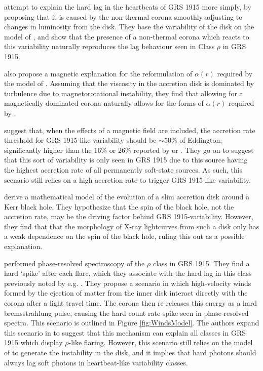 \par \citealp{Janiuk_Lag} attempt to explain the hard lag in the heartbeats of GRS 1915 more simply, by proposing that it is caused by the non-thermal corona smoothly adjusting to changes in luminosity from the disk.  They base the variability of the disk on the model of \citealp{Nayakshin_GRSModel}, and show that the presence of a non-thermal corona which reacts to this variability naturally reproduces the lag behaviour seen in Class $\rho$ in GRS 1915.
\par \citealp{Merloni_MagDom} also propose a magnetic explanation for the reformulation of $\alpha(r)$ required by the model of \citealp{Nayakshin_GRSModel}.  Assuming that the viscosity in the accretion disk is dominated by turbulence due to magnetorotational instability, they find that allowing for a magnetically dominated corona naturally allows for the forms of $\alpha(r)$ required by \citealp{Nayakshin_GRSModel}.
\par \citealp{Zheng_Model} suggest that, when the effects of a magnetic field are included, the accretion rate threshold for GRS 1915-like variability should be $\sim50$\% of Eddington; significantly higher than the 16\% or 26\% reported by \citealp{Janiuk_RadInstab} or \citealp{Nayakshin_GRSModel}.  They go on to suggest that this sort of variability is only seen in GRS 1915 due to this source having the highest accretion rate of all permanently soft-state sources.  As such, this scenario still relies on a high accretion rate to trigger GRS 1915-like variability.%
\par \citealp{Xue_Spin} derive a mathematical model of the evolution of a slim accretion disk around a Kerr black hole.  They hypothesize that the spin of the black hole, not the accretion rate, may be the driving factor behind GRS 1915-variability.  However, they find that that the morphology of X-ray lightcurves from such a disk only has a weak dependence on the spin of the black hole, ruling this out as a possible explanation.
\par \citealp{Neilsen_GRSModel} performed phase-resolved spectroscopy of the $\rho$ class in GRS 1915.  They find a hard `spike' after each flare, which they associate with the hard lag in this class previously noted by e.g. \citealp{Janiuk_Lag}.  They propose a scenario in which high-velocity winds formed by the ejection of matter from the inner disk interact directly with the corona after a light travel time.  The corona then re-releases this energy as a hard bremsstrahlung pulse, causing the hard count rate spike seen in phase-resolved spectra.  This scenario is outlined in Figure \ref{fig:WindsModel}.  The authors expand this scenario in \citealp{Neilsen_Rho} to suggest that this mechanism can explain all classes in GRS 1915 which display $\rho$-like flaring.  However, this scenario still relies on the model of \citealp{Nayakshin_GRSModel} to generate the instability in the disk, and it implies that hard photons should always lag soft photons in heartbeat-like variability classes.

